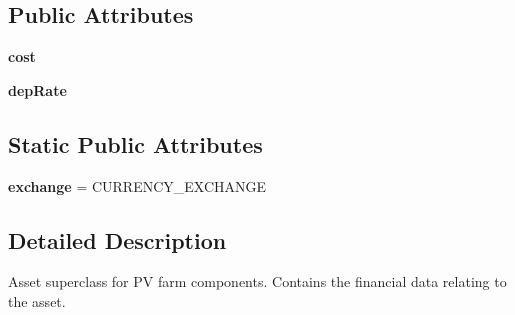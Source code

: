 \subsection*{Public Attributes}
\begin{DoxyCompactItemize}
\item 
\hypertarget{class_solar_calculator_1_1_assets_1_1_asset_acf2c14f489490677108cb675709fdca0}{{\bfseries cost}}\label{class_solar_calculator_1_1_assets_1_1_asset_acf2c14f489490677108cb675709fdca0}

\item 
\hypertarget{class_solar_calculator_1_1_assets_1_1_asset_aee3cc3baf193b7df83efe1c045f98eb8}{{\bfseries dep\-Rate}}\label{class_solar_calculator_1_1_assets_1_1_asset_aee3cc3baf193b7df83efe1c045f98eb8}

\end{DoxyCompactItemize}
\subsection*{Static Public Attributes}
\begin{DoxyCompactItemize}
\item 
\hypertarget{class_solar_calculator_1_1_assets_1_1_asset_a3b5f305d50c0ec469d3e1136cab332e6}{{\bfseries exchange} = C\-U\-R\-R\-E\-N\-C\-Y\-\_\-\-E\-X\-C\-H\-A\-N\-G\-E}\label{class_solar_calculator_1_1_assets_1_1_asset_a3b5f305d50c0ec469d3e1136cab332e6}

\end{DoxyCompactItemize}


\subsection{Detailed Description}
\begin{DoxyVerb}Asset superclass for PV farm components. Contains the financial data relating to the
    asset. \end{DoxyVerb}
 


